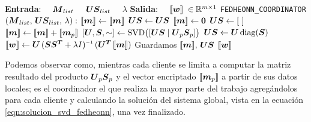 \documentclass[00-Trabajo_Final.tex]{subfiles}
\begin{document}
\begin{algorithm}[ht]
\caption{Pseudocódigo para coordinador FedHEONN}
\label{alg:fedcoord}
\begin{algorithmic}[1]
\STATE \textbf{Entrada}: 
    \STATE $\quad \boldsymbol{M}_{list}$ \hfill {}
    \STATE $\quad \boldsymbol{US}_{list}$ \hfill {}
    \STATE $\quad \lambda$ \hfill {}
\STATE \textbf{Salida}:
    \STATE $\quad [\![\boldsymbol{w}]\!]\; \in \mathbb{R}^{m \times 1}$ \hfill {}
\REQUIRE \verb|FEDHEONN_COORDINATOR|$(\boldsymbol{M}_{list},\, \boldsymbol{US}_{list},\,\lambda):$
        \STATE $[\![\boldsymbol{m}]\!] \gets [\![\boldsymbol{m}]\!]$  \hfill {}
        \STATE $\boldsymbol{US} \gets \boldsymbol{US}$  \hfill {}
    \ELSE
        \STATE $[\![\boldsymbol{m}]\!] \gets \boldsymbol{0}$ \hfill {}
        \STATE $\boldsymbol{US} \gets [\ ]$ \hfill {}
    \ENDIF
        \STATE $[\![\boldsymbol{m}]\!] \gets [\![\boldsymbol{m}]\!] + [\![\boldsymbol{m}_p]\!]$ \hfill {}
        \STATE $[\boldsymbol{U}, \boldsymbol{S}, \sim] \gets \text{SVD}\bigl([\boldsymbol{US} \mid \boldsymbol{U}_p\boldsymbol{S}_p]\bigr)$ \hfill {}
        \STATE $\boldsymbol{US} \gets \boldsymbol{U} \, \text{diag}(\boldsymbol{S})$ \hfill {}
    \ENDFOR
    \STATE $[\![\bsym{w}]\!] \gets \bsym{U} \, (\bsym{SS^T} + \lambda I)\inv \, (\bsym{U^T} \, [\![\bsym{m}]\!])$ \hfill {}
    \STATE Guardamos $[\![\boldsymbol{m}]\!],\, \boldsymbol{US}$ \hfill {}
    \RETURN $[\![\boldsymbol{w}]\!]$
\ENSURE
\end{algorithmic}
\end{algorithm}

Podemos observar como, mientras cada cliente se limita a computar la matriz resultado del producto $\boldsymbol{U}_p\boldsymbol{S}_p$ y el vector encriptado $[\![\boldsymbol{m}_p]\!]$ a partir de sus datos locales; es el coordinador el que realiza la mayor parte del trabajo agregándolos para cada cliente y calculando la solución del sistema global, vista en la ecuación \ref{eqn:solucion_svd_fedheonn}, una vez finalizado.
\end{document}
